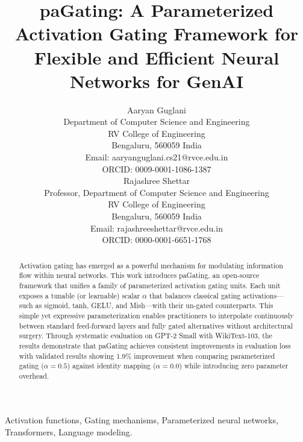 \documentclass[journal]{IEEEtran}
\begin{document}
\title{paGating: A Parameterized Activation Gating Framework for Flexible and Efficient Neural Networks for GenAI}

\author{Aaryan Guglani\\
        Department of Computer Science and Engineering\\
        RV College of Engineering\\
        Bengaluru, 560059 India\\
        Email: aaryanguglani.cs21@rvce.edu.in\\
        ORCID: 0009-0001-1086-1387\\[1em]
        Rajashree Shettar\\
        Professor, Department of Computer Science and Engineering\\
        RV College of Engineering\\
        Bengaluru, 560059 India\\
        Email: rajashreeshettar@rvce.edu.in\\
        ORCID: 0000-0001-6651-1768
}

\maketitle

\begin{abstract}
Activation gating has emerged as a powerful mechanism for modulating information flow within neural networks. This work introduces paGating, an open-source framework that unifies a family of parameterized activation gating units. Each unit exposes a tunable (or learnable) scalar $\alpha$ that balances classical gating activations—such as sigmoid, tanh, GELU, and Mish—with their un-gated counterparts. This simple yet expressive parameterization enables practitioners to interpolate continuously between standard feed-forward layers and fully gated alternatives without architectural surgery. Through systematic evaluation on GPT-2 Small with WikiText-103, the results demonstrate that paGating achieves consistent improvements in evaluation loss with validated results showing 1.9\% improvement when comparing parameterized gating ($\alpha=0.5$) against identity mapping ($\alpha=0.0$) while introducing zero parameter overhead.
\end{abstract}

\begin{IEEEkeywords}
Activation functions, Gating mechanisms, Parameterized neural networks, Transformers, Language modeling.
\end{IEEEkeywords}
\end{document}
